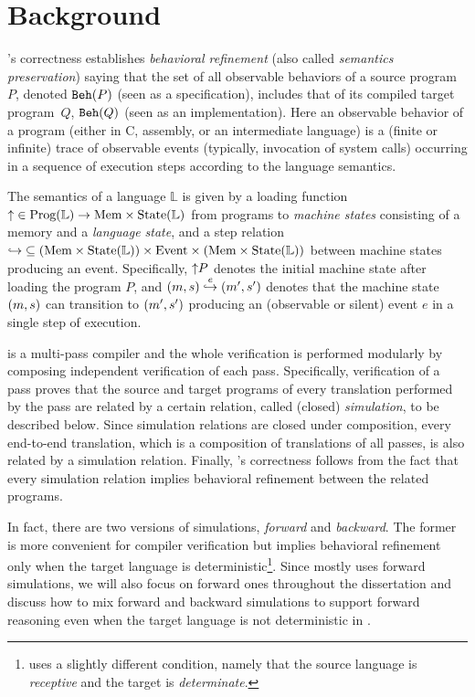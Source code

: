 \section{Background}
\label{sec:rusc:background}


\cc{}'s correctness establishes \emph{behavioral refinement}
(also called \emph{semantics preservation}) saying that
the set of all observable behaviors of a source program~$P$, denoted $\mathtt{Beh}({P})$ (seen as a specification),
includes that of its compiled target program~$Q$, \ie $\mathtt{Beh}({Q})$ (seen as an implementation).
Here an observable behavior of a program (either in C, assembly, or an
intermediate language) is a (finite or infinite) trace of observable events
(typically, invocation of system calls) occurring in a sequence of execution steps according to the language semantics.

The semantics of a language $\mathbb{L}$ is given by a loading
function ${{\uparrow}} \in \textrm{Prog}(\mathbb{L}) \to \textrm{Mem}\times\textrm{State}(\mathbb{L})$
from programs to \emph{machine states} consisting of a memory and a \emph{language state},
and a step relation
${\hookrightarrow} \subseteq { (\textrm{Mem}\times\textrm{State}(\mathbb{L})) \times \textrm{Event}\times (\textrm{Mem}\times\textrm{State}(\mathbb{L}))}$
between machine states producing an event.
Specifically, ${\uparrow}{P}$ denotes the initial machine state after loading the program $P$, and
$(m,s) \stackrel{e}{\hookrightarrow} (m',s')$ denotes that the machine state $(m,s)$ can transition to
$(m',s')$ producing an (observable or silent) event $e$ in a single step of
execution.

\cc{} is a multi-pass compiler and the whole verification is performed modularly
by composing independent verification of each pass. Specifically,
verification of a pass proves that the source and target programs of every translation
performed by the pass are related by a certain relation,
called (closed) \emph{simulation}, to be described below.
Since simulation relations are closed under composition, every
end-to-end translation, which is a composition of translations of all
passes, is also related by a simulation relation. Finally, \cc{}'s
correctness follows from the fact that every simulation relation implies
behavioral refinement between the related programs.

In fact, there are two versions of simulations, \emph{forward}
and \emph{backward}.  The former is more convenient for compiler
verification but implies behavioral refinement only when the target
language is deterministic\footnote{\cc{} uses a slightly different
  condition, namely that the source language is \emph{receptive} and
  the target is \emph{determinate}.}. Since \cc{} mostly uses forward
simulations, we will also focus on forward ones throughout the dissertation
and discuss how to mix forward and backward simulations
to support forward reasoning even when the target language is not deterministic
in .


